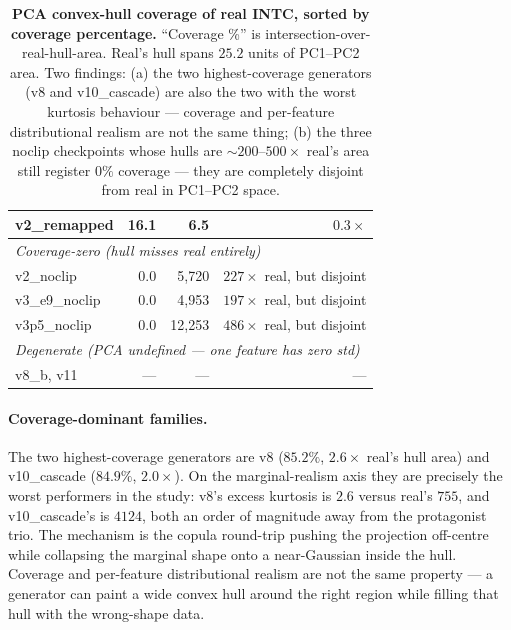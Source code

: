 \documentclass[journal]{IEEEtran}
\theoremstyle{definition}   %
\begin{document}
\begin{table}[ht]
\begin{tabular}{lrrr}
        v2\_remapped & 16.1 & 6.5  & $0.3\times$ \\
        \midrule
        \multicolumn{4}{l}{\textit{Coverage-zero (hull misses real entirely)}} \\
        v2\_noclip    & 0.0 & 5{,}720 & $227\times$ real, but disjoint \\
        v3\_e9\_noclip& 0.0 & 4{,}953 & $197\times$ real, but disjoint \\
        v3p5\_noclip  & 0.0 & 12{,}253& $486\times$ real, but disjoint \\
        \midrule
        \multicolumn{4}{l}{\textit{Degenerate (PCA undefined --- one feature has zero std)}} \\
        v8\_b, v11    & --- & --- & --- \\
        \bottomrule
    \end{tabular}
    \caption{\textbf{PCA convex-hull coverage of real INTC, sorted
    by coverage percentage.} ``Coverage \%'' is
    intersection-over-real-hull-area. Real's hull spans $25.2$
    units of PC1--PC2 area. Two findings: (a) the two
    highest-coverage generators (v8 and v10\_cascade) are also the
    two with the worst kurtosis behaviour --- coverage and
    per-feature distributional realism are not the same thing;
    (b) the three noclip checkpoints whose hulls are
    $\sim 200$--$500\times$ real's area still register $0\%$
    coverage --- they are completely disjoint from real in
    PC1--PC2 space.}
    \label{tab:pca_coverage_top}
\end{table}

\paragraph{Coverage-dominant families.}
The two highest-coverage generators are v8 ($85.2\%$,
$2.6\times$ real's hull area) and v10\_cascade ($84.9\%$,
$2.0\times$). On the marginal-realism axis they are precisely the
worst performers in the study: v8's excess kurtosis is $2.6$
versus real's $755$, and v10\_cascade's is $4124$, both an order
of magnitude away from the protagonist trio. The mechanism is the
copula round-trip pushing the projection off-centre while
collapsing the marginal shape onto a near-Gaussian inside the
hull. Coverage and per-feature distributional realism are not the
same property --- a generator can paint a wide convex hull around
the right region while filling that hull with the wrong-shape
data.
\end{document}
